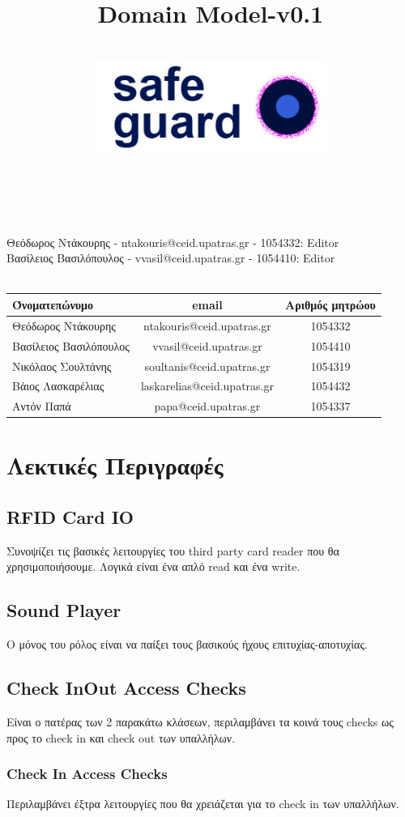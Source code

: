 \documentclass{article}
\title{Domain Model-v0.1}
\author{\\
\includegraphics[width=3in]{safeguard}\\[1ex]\\\\
}
\begin{document}
\maketitle

\newpage

Θεόδωρος Ντάκουρης - ntakouris@ceid.upatras.gr - 1054332: Editor \\
Βασίλειος Βασιλόπουλος - vvasil@ceid.upatras.gr - 1054410: Editor \\
\\

\begin{tabular}{|l|c|c|}
\hline
Όνοματεπώνυμο & email & Αριθμός μητρώου  \\
\hline
Θεόδωρος Ντάκουρης & ntakouris@ceid.upatras.gr & 1054332 \\
Βασίλειος Βασιλόπουλος & vvasil@ceid.upatras.gr &  1054410 \\
Νικόλαος Σουλτάνης & soultanis@ceid.upatras.gr & 1054319  \\
Βάιος Λασκαρέλιας & laskarelias@ceid.upatras.gr & 1054432 \\
Αντόν Παπά & papa@ceid.upatras.gr & 1054337 \\
\hline
\end{tabular}

\renewcommand{\contentsname}{Περιεχόμενα}
\tableofcontents

\section{Λεκτικές Περιγραφές}

\subsection{RFID Card IO}
Συνοψίζει τις βασικές λειτουργίες του third party card reader που θα χρησιμοποιήσουμε. Λογικά είναι ένα απλό read και ένα write.
\subsection{Sound Player}
Ο μόνος του ρόλος είναι να παίξει τους βασικούς ήχους επιτυχίας-αποτυχίας.
\subsection{Check InOut Access Checks}
Είναι ο πατέρας των 2 παρακάτω κλάσεων, περιλαμβάνει τα κοινά τους checks ως προς το check in και check out των υπαλλήλων.
\subsubsection{Check In Access Checks}
Περιλαμβάνει έξτρα λειτουργίες που θα χρειάζεται για το check in των υπαλλήλων.
\end{document}
